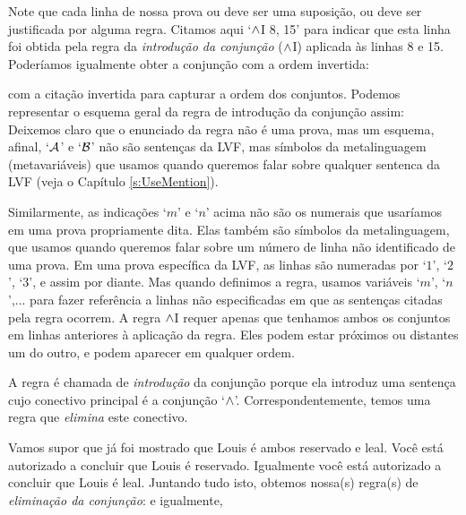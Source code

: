 \begin{fitchproof}
	 
\end{fitchproof}

 Note que cada linha de nossa prova  ou deve ser uma suposição, ou deve ser justificada por alguma regra.    Citamos  aqui   `$\wedge$I 8, 15' para indicar que esta linha foi obtida pela regra da \textit{introdução da conjunção}  ($\wedge$I) aplicada às linhas 8 e 15.  Poderíamos igualmente obter a conjunção com a ordem invertida:
\begin{fitchproof}
	 
\end{fitchproof}
 com a citação invertida para capturar a ordem  dos  conjuntos. 
Podemos representar o esquema geral da regra de introdução da conjunção assim:
Deixemos claro que o enunciado da regra não é uma prova, mas um esquema, afinal, `$\mathcal{A}$'  e `$\mathcal{B}$' não são sentenças da LVF, mas símbolos da metalinguagem (metavariáveis) que usamos quando queremos falar sobre qualquer sentenca da LVF (veja o Capítulo \ref{s:UseMention}). 

Similarmente, as indicações `$m$' e `$n$' acima não são os numerais que usaríamos em uma prova propriamente dita. Elas também são símbolos da metalinguagem, que usamos quando queremos falar sobre um número de linha não identificado de uma prova. Em uma  prova específica da LVF, as linhas  são numeradas por `$1$', `$2$', `$3$', e assim por diante.  Mas quando definimos a regra, usamos variáveis `$m$', `$n$',...  para fazer referência a linhas não especificadas em que as sentenças citadas pela regra ocorrem.
A regra $\wedge$I requer apenas que tenhamos ambos os conjuntos em linhas anteriores à aplicação da regra. Eles podem estar próximos ou distantes um do outro, e podem aparecer em qualquer ordem.

A regra é chamada de \emph{introdução} da conjunção  porque  ela introduz   uma sentença cujo conectivo principal é a conjunção `$\wedge$'.  Correspondentemente,  temos uma regra que \emph{elimina}  este conectivo. 

 Vamos supor que já foi mostrado que Louis é ambos  reservado e  leal.  Você   está autorizado a concluir que Louis   é reservado. Igualmente você   está autorizado a concluir que Louis é leal. Juntando tudo isto, obtemos nossa(s) regra(s) de \textit{eliminação da conjunção}:
e igualmente, 

